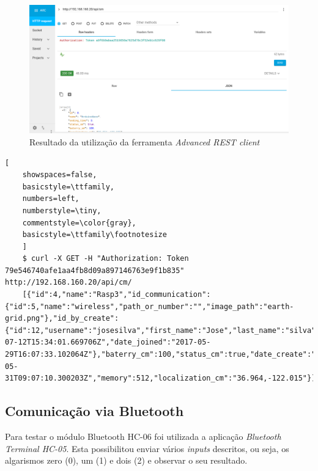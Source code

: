\begin{figure}[h]
	\centering
	\includegraphics[width=0.7\linewidth]{prints-web/API_teste1.png}
	\caption{Resultado da utilização da ferramenta \textit{Advanced REST client}}
	\label{testgrap}
\end{figure}







	\begin{lstlisting}[
	showspaces=false,
	basicstyle=\ttfamily,
	numbers=left,
	numberstyle=\tiny,
	commentstyle=\color{gray},
	basicstyle=\ttfamily\footnotesize
	]
	$ curl -X GET -H "Authorization: Token  79e546740afe1aa4fb8d09a897146763e9f1b835" http://192.168.160.20/api/cm/
	[{"id":4,"name":"Rasp3","id_communication":{"id":5,"name":"wireless","path_or_number":"","image_path":"earth-grid.png"},"id_by_create":{"id":12,"username":"josesilva","first_name":"Jose","last_name":"silva","email":"ruipedrooliveira@ua.pt","last_login":"2017-07-12T15:34:01.669706Z","date_joined":"2017-05-29T16:07:33.102064Z"},"baterry_cm":100,"status_cm":true,"date_create":"2017-05-31T09:07:10.300203Z","memory":512,"localization_cm":"36.964,-122.015"}]
	\end{lstlisting}
	
	


\subsection{Comunicação via Bluetooth }


Para testar o módulo Bluetooth HC-06 foi utilizada a aplicação \textit{Bluetooth Terminal HC-05}. Esta possibilitou enviar vários \textit{inputs} descritos, ou seja,  os algarismos zero (0), um (1) e dois (2) e observar o seu resultado.  

